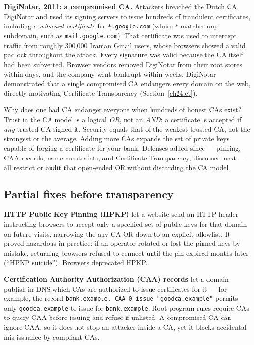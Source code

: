 \begin{attackbox}
\textbf{DigiNotar, 2011: a compromised CA.} Attackers breached the Dutch CA DigiNotar and used its signing servers to issue hundreds of fraudulent certificates, including a \emph{wildcard certificate} for \texttt{*.google.com} (where \texttt{*} matches any subdomain, such as \texttt{mail.google.com}). That certificate was used to intercept traffic from roughly 300{,}000 Iranian Gmail users, whose browsers showed a valid padlock throughout the attack. Every signature was valid because the CA itself had been subverted. Browser vendors removed DigiNotar from their root stores within days, and the company went bankrupt within weeks. DigiNotar demonstrated that a single compromised CA endangers every domain on the web, directly motivating Certificate Transparency (Section~\ref{ch24:ct}).
\end{attackbox}

\begin{whybox}
Why does one bad CA endanger everyone when hundreds of honest CAs exist? Trust in the CA model is a logical \emph{OR}, not an \emph{AND}: a certificate is accepted if \emph{any} trusted CA signed it. Security equals that of the weakest trusted CA, not the strongest or the average. Adding more CAs expands the set of private keys capable of forging a certificate for your bank. Defenses added since --- pinning, CAA records, name constraints, and Certificate Transparency, discussed next --- all restrict or audit that open-ended OR without discarding the CA model.
\end{whybox}

\subsection{Partial fixes before transparency}

\textbf{HTTP Public Key Pinning (HPKP)} let a website send an HTTP header instructing browsers to accept only a specified set of public keys for that domain on future visits, narrowing the any-CA OR down to an explicit allowlist. It proved hazardous in practice: if an operator rotated or lost the pinned keys by mistake, returning browsers refused to connect until the pin expired months later (``HPKP suicide''). Browsers deprecated HPKP.

\textbf{Certification Authority Authorization (CAA) records} let a domain publish in DNS which CAs are authorized to issue certificates for it --- for example, the record \texttt{bank.example.\allowbreak\ CAA\allowbreak\ 0\allowbreak\ issue\allowbreak\ "goodca.example"} permits only \texttt{goodca.example} to issue for \texttt{bank.example}. Root-program rules require CAs to query CAA before issuing and refuse if unlisted. A compromised CA can ignore CAA, so it does not stop an attacker inside a CA, yet it blocks accidental mis-issuance by compliant CAs.

